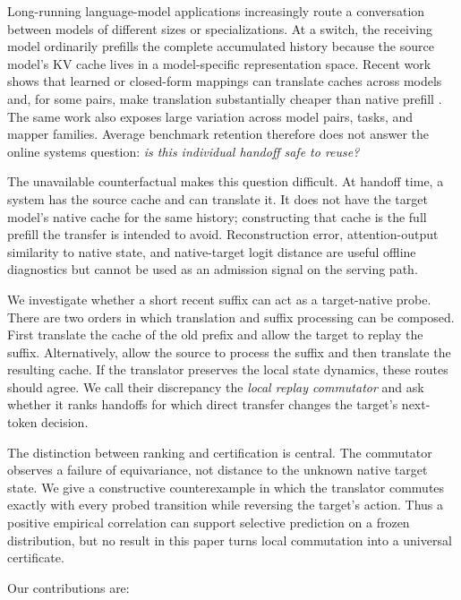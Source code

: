\documentclass[10pt,twocolumn]{article}
\begin{document}
Long-running language-model applications increasingly route a conversation
between models of different sizes or specializations.  At a switch, the
receiving model ordinarily prefills the complete accumulated history because
the source model's KV cache lives in a model-specific representation space.
Recent work shows that learned or closed-form mappings can translate caches
across models and, for some pairs, make translation substantially cheaper than
native prefill \citep{fu2026c2c,heo2026crossmodel,lee2026mot}.  The same work
also exposes large variation across model pairs, tasks, and mapper families.
Average benchmark retention therefore does not answer the online systems
question: \emph{is this individual handoff safe to reuse?}

The unavailable counterfactual makes this question difficult.  At handoff
time, a system has the source cache and can translate it.  It does not have the
target model's native cache for the same history; constructing that cache is
the full prefill the transfer is intended to avoid.  Reconstruction error,
attention-output similarity to native state, and native-target logit distance
are useful offline diagnostics but cannot be used as an admission signal on
the serving path.

We investigate whether a short recent suffix can act as a target-native probe.
There are two orders in which translation and suffix processing can be
composed.  First translate the cache of the old prefix and allow the target to
replay the suffix.  Alternatively, allow the source to process the suffix and
then translate the resulting cache.  If the translator preserves the local
state dynamics, these routes should agree.  We call their discrepancy the
\emph{local replay commutator} and ask whether it ranks handoffs for which
direct transfer changes the target's next-token decision.

The distinction between ranking and certification is central.  The
commutator observes a failure of equivariance, not distance to the unknown
native target state.  We give a constructive counterexample in which the
translator commutes exactly with every probed transition while reversing the
target's action.  Thus a positive empirical correlation can support selective
prediction on a frozen distribution, but no result in this paper turns local
commutation into a universal certificate.

Our contributions are:
\end{document}

